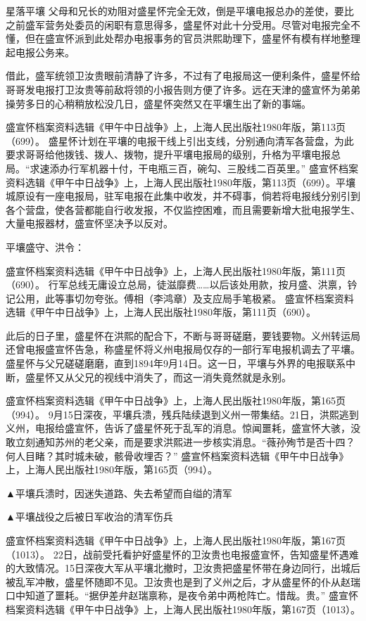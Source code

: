 \documentclass[12pt,UTF8]{ctexbook}
\begin{document}
星落平壤
父母和兄长的劝阻对盛星怀完全无效，倒是平壤电报总办的差使，要比之前盛军营务处委员的闲职有意思得多，盛星怀对此十分受用。尽管对电报完全不懂，但在盛宣怀派到此处帮办电报事务的官员洪熙助理下，盛星怀有模有样地整理起电报公务来。

借此，盛军统领卫汝贵眼前清静了许多，不过有了电报局这一便利条件，盛星怀给哥哥发电报打卫汝贵等前敌将领的小报告则方便了许多。远在天津的盛宣怀为弟弟操劳多日的心稍稍放松没几日，盛星怀突然又在平壤生出了新的事端。

盛宣怀档案资料选辑《甲午中日战争》上，上海人民出版社1980年版，第113页（699）。
盛星怀计划在平壤的电报干线上引出支线，分别通向清军各营盘，为此要求哥哥给他拨钱、拨人、拨物，提升平壤电报局的级别，升格为平壤电报总局。“求速添办行军机器十付，干电瓶三百，碗勾、三股线二百英里。” 盛宣怀档案资料选辑《甲午中日战争》上，上海人民出版社1980年版，第113页（699）。平壤城原设有一座电报局，驻军电报在此集中收发，并不碍事，倘若将电报线分别引到各个营盘，使各营都能自行收发报，不仅监控困难，而且需要新增大批电报学生、大量电报器材，盛宣怀坚决予以反对。

平壤盛守、洪令：

盛宣怀档案资料选辑《甲午中日战争》上，上海人民出版社1980年版，第111页（690）。
行军总线无庸设立总局，徒滋靡费……以后该处用款，按月盛、洪禀，钤记公用，此等事切勿夸张。傅相（李鸿章）及支应局手笔极紧。 盛宣怀档案资料选辑《甲午中日战争》上，上海人民出版社1980年版，第111页（690）。

此后的日子里，盛星怀在洪熙的配合下，不断与哥哥磋磨，要钱要物。义州转运局还曾电报盛宣怀告急，称盛星怀将义州电报局仅存的一部行军电报机调去了平壤。盛星怀与父兄磋磋磨磨，直到1894年9月14日。这一日，平壤与外界的电报联系中断，盛星怀又从父兄的视线中消失了，而这一消失竟然就是永别。

盛宣怀档案资料选辑《甲午中日战争》上，上海人民出版社1980年版，第165页（994）。
9月15日深夜，平壤兵溃，残兵陆续退到义州一带集结。21日，洪熙逃到义州，电报给盛宣怀，告诉了盛星怀死于乱军的消息。惊闻噩耗，盛宣怀大骇，没敢立刻通知苏州的老父亲，而是要求洪熙进一步核实消息。“薇孙殉节是否十四？何人目睹？其时城未破，骸骨收埋否？” 盛宣怀档案资料选辑《甲午中日战争》上，上海人民出版社1980年版，第165页（994）。


▲平壤兵溃时，因迷失道路、失去希望而自缢的清军


▲平壤战役之后被日军收治的清军伤兵

盛宣怀档案资料选辑《甲午中日战争》上，上海人民出版社1980年版，第167页（1013）。
22日，战前受托看护好盛星怀的卫汝贵也电报盛宣怀，告知盛星怀遇难的大致情况。15日深夜大军从平壤北撤时，卫汝贵把盛星怀带在身边同行，出城后被乱军冲散，盛星怀随即不见。卫汝贵也是到了义州之后，才从盛星怀的仆从赵瑞口中知道了噩耗。“据伊差弁赵瑞禀称，是夜令弟中两枪阵亡。惜哉。贵。” 盛宣怀档案资料选辑《甲午中日战争》上，上海人民出版社1980年版，第167页（1013）。
\end{document}

